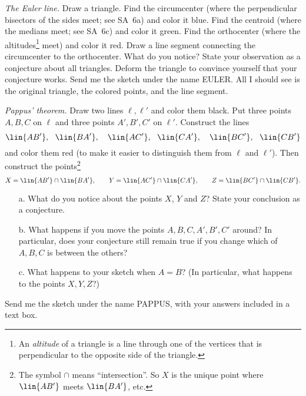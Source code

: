 \begin{SA} \textit{The Euler line.}
Draw a triangle.  Find the circumcenter (where the perpendicular
bisectors of the sides meet; see SA~6a) and color it blue.
Find the centroid (where the medians meet; see SA~6c) and color
it green.  Find the orthocenter (where the altitudes\footnote{%
  An \emph{altitude} of a triangle is a line through one of the
  vertices that is perpendicular to the opposite side of the triangle.}
meet) and color it red.  Draw a line segment connecting the
circumcenter to the orthocenter.  What do you notice?  State your observation
as a conjecture about all triangles.  Deform the triangle to convince
yourself that your conjecture works.  Send me the sketch under the name
EULER.  All I should see is the original triangle, the colored points,
and the line segment.
\end{SA}

\begin{SA} \textit{Pappus' theorem.}
Draw two lines $\ell,\ell'$ and color them black.  Put three points $A,B,C$ on $\ell$
and three points $A',B',C'$ on $\ell'$.  Construct the lines
  $$\lin{AB'},\ \ \lin{BA'},\quad
    \lin{AC'},\ \ \lin{CA'},\quad
    \lin{BC'},\ \ \lin{CB'}$$
and color them red (to make it easier to distinguish them from $\ell$ and $\ell'$).
Then construct the points\footnote{%
  The symbol $\cap$ means ``intersection''.  So $X$ is the unique
  point where $\lin{AB'}$ meets $\lin{BA'}$, etc.}
  $$X = \lin{AB'}\cap\lin{BA'},\qquad
    Y = \lin{AC'}\cap\lin{CA'},\qquad
    Z = \lin{BC'}\cap\lin{CB'}.$$
\begin{itemize}
\item[a.] What do you notice about the points $X$, $Y$ and $Z$?
State your conclusion as a conjecture.
\item[b.]  What happens if you move the points $A,B,C,A',B',C'$ around?
In particular, does your conjecture still remain true if you change
which of $A,B,C$ is between the others?
\item[c.] What happens to your sketch when $A=B$?  (In particular,
what happens to the points $X,Y,Z$?)
\end{itemize}
Send me the sketch under the name PAPPUS, with your answers included in a
text box.
\end{SA}

